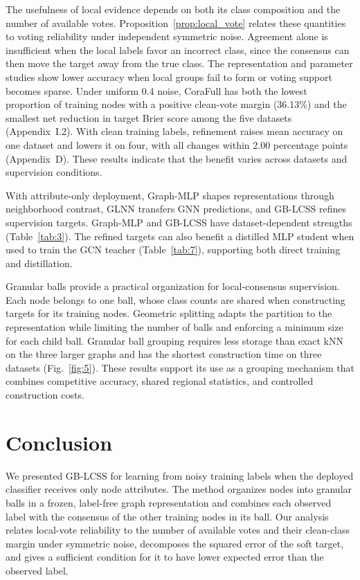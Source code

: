 \documentclass[times,review,10pt]{elsarticle}
\theoremstyle{definition}
\theoremstyle{plain}
\begin{document}
The usefulness of local evidence depends on both its class composition and the number of available votes. Proposition~\ref{prop:local_vote} relates these quantities to voting reliability under independent symmetric noise. Agreement alone is insufficient when the local labels favor an incorrect class, since the consensus can then move the target away from the true class. The representation and parameter studies show lower accuracy when local groups fail to form or voting support becomes sparse. Under uniform 0.4 noise, CoraFull has both the lowest proportion of training nodes with a positive clean-vote margin (36.13\%) and the smallest net reduction in target Brier score among the five datasets (Appendix~I.2). With clean training labels, refinement raises mean accuracy on one dataset and lowers it on four, with all changes within 2.00 percentage points (Appendix~D). These results indicate that the benefit varies across datasets and supervision conditions.

With attribute-only deployment, Graph-MLP shapes representations through neighborhood contrast, GLNN transfers GNN predictions, and GB-LCSS refines supervision targets. Graph-MLP and GB-LCSS have dataset-dependent strengths (Table~\ref{tab:3}). The refined targets can also benefit a distilled MLP student when used to train the GCN teacher (Table~\ref{tab:7}), supporting both direct training and distillation.

Granular balls provide a practical organization for local-consensus supervision. Each node belongs to one ball, whose class counts are shared when constructing targets for its training nodes. Geometric splitting adapts the partition to the representation while limiting the number of balls and enforcing a minimum size for each child ball. Granular ball grouping requires less storage than exact kNN on the three larger graphs and has the shortest construction time on three datasets (Fig.~\ref{fig:5}). These results support its use as a grouping mechanism that combines competitive accuracy, shared regional statistics, and controlled construction costs.

\section{Conclusion}\label{sec:5}

We presented GB-LCSS for learning from noisy training labels when the deployed classifier receives only node attributes. The method organizes nodes into granular balls in a frozen, label-free graph representation and combines each observed label with the consensus of the other training nodes in its ball. Our analysis relates local-vote reliability to the number of available votes and their clean-class margin under symmetric noise, decomposes the squared error of the soft target, and gives a sufficient condition for it to have lower expected error than the observed label.
\end{document}
